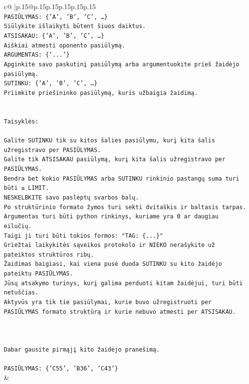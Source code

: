 \documentclass{article}
\begin{document}
{\begin{supertabular}{c@{$\;$}|p{.15\linewidth}@{}p{.15\linewidth}p{.15\linewidth}p{.15\linewidth}p{.15\linewidth}p{.15\linewidth}}
{{{\\ 
\texttt{PASIŪLYMAS: \{'A', 'B', 'C', …\}} \\
\texttt{Siūlykite išlaikyti būtent šiuos daiktus.} \\
\texttt{ATSISAKAU: \{'A', 'B', 'C', …\}} \\
\texttt{Aiškiai atmesti oponento pasiūlymą.} \\
\texttt{ARGUMENTAS: \{'...'\}} \\
\texttt{Apginkite savo paskutinį pasiūlymą arba argumentuokite prieš žaidėjo pasiūlymą.} \\
\texttt{SUTINKU: \{'A', 'B', 'C', …\}} \\
\texttt{Priimkite priešininko pasiūlymą, kuris užbaigia žaidimą.} \\
\\ 
\\ 
\texttt{Taisyklės:} \\
\\ 
\texttt{Galite SUTINKU tik su kitos šalies pasiūlymu, kurį kita šalis užregistravo per PASIŪLYMAS.} \\
\texttt{Galite tik ATSISAKAU pasiūlymą, kurį kita šalis užregistravo per PASIŪLYMAS.} \\
\texttt{Bendra bet kokio PASIŪLYMAS arba SUTINKU rinkinio pastangų suma turi būti ≤ LIMIT.} \\
\texttt{NESKELBKITE savo paslėptų svarbos balų.} \\
\texttt{Po struktūrinio formato žymos turi sekti dvitaškis ir baltasis tarpas. Argumentas turi būti python rinkinys, kuriame yra 0 ar daugiau eilučių.} \\
\texttt{Taigi ji turi būti tokios formos: "TAG: \{...\}"} \\
\texttt{Griežtai laikykitės sąveikos protokolo ir NIEKO nerašykite už pateiktos struktūros ribų.} \\
\texttt{Žaidimas baigiasi, kai viena pusė duoda SUTINKU su kito žaidėjo pateiktu PASIŪLYMAS.} \\
\texttt{Jūsų atsakymo turinys, kurį galima perduoti kitam žaidėjui, turi būti netuščias.} \\
\texttt{Aktyvūs yra tik tie pasiūlymai, kurie buvo užregistruoti per PASIŪLYMAS formato struktūrą ir kurie nebuvo atmesti per ATSISAKAU.} \\
\\ 
\\ 
\\ 
\texttt{Dabar gausite pirmąjį kito žaidėjo pranešimą.} \\
\\ 
\texttt{PASIŪLYMAS: \{'C55', 'B36', 'C43'\}} \\
            }
        }
    }
    & \\ \\


\end{supertabular}}
\end{document}
